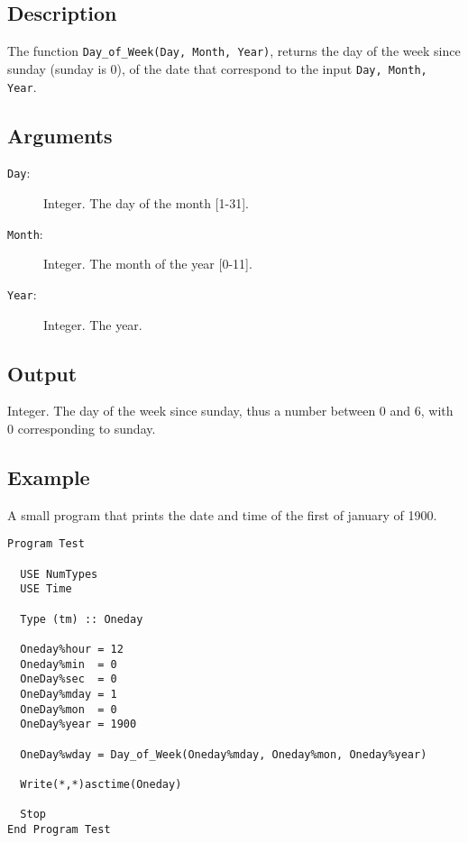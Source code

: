 \subsection{Description}

The function \texttt{Day\_of\_Week(Day, Month, Year)}, returns the
day of the week since sunday (sunday is 0), of the date that
correspond to the input \texttt{Day, Month, Year}.

\subsection{Arguments}

\begin{description}
\item[\texttt{Day}: ] Integer. The day of the month [1-31].
\item[\texttt{Month}: ] Integer. The month of the year [0-11].
\item[\texttt{Year}: ] Integer. The year.
\end{description}

\subsection{Output}

Integer. The day of the week since sunday, thus a number between 0 and
6, with 0 corresponding to sunday.

\subsection{Example}

A small program that prints the date and time of the first of
january of 1900.

\begin{lstlisting}[emph=Day_Of_Week,
                   emphstyle=\color{blue},
                   frame=trBL,
                   caption=Day of week of the first of January 1900.,
                   label=day_of_week]
Program Test

  USE NumTypes
  USE Time

  Type (tm) :: Oneday

  Oneday%hour = 12
  Oneday%min  = 0
  OneDay%sec  = 0
  OneDay%mday = 1
  OneDay%mon  = 0
  OneDay%year = 1900

  OneDay%wday = Day_of_Week(Oneday%mday, Oneday%mon, Oneday%year)

  Write(*,*)asctime(Oneday)

  Stop
End Program Test
\end{lstlisting}


